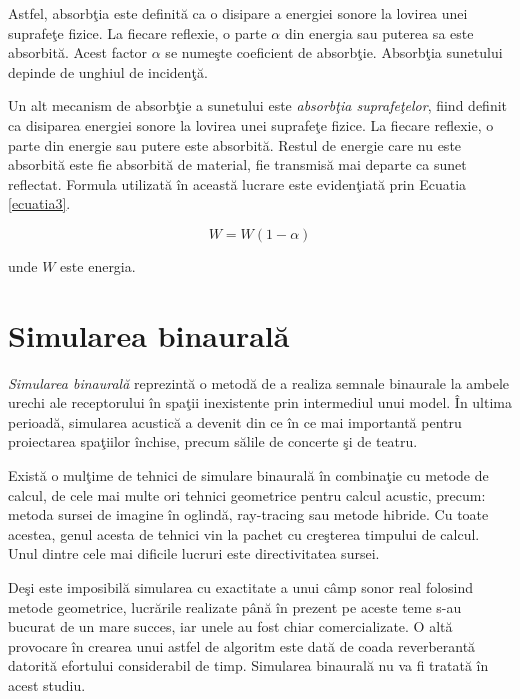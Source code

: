 	Astfel, absorb\c{t}ia este definit\u{a} ca o disipare a energiei sonore la lovirea unei suprafe\c{t}e fizice. La fiecare reflexie, o parte $\alpha$ din energia sau puterea sa este absorbit\u{a}. Acest factor $\alpha$ se nume\c{s}te coeficient de absorb\c{t}ie. Absorb\c{t}ia sunetului depinde de unghiul de inciden\c{t}\u{a}.
	\bigskip
	
	Un alt mecanism de absorb\c{t}ie a sunetului este \textit{absorb\c{t}ia suprafe\c{t}elor}, fiind definit ca disiparea energiei sonore la lovirea unei suprafe\c{t}e fizice. La fiecare reflexie, o parte din energie sau putere este absorbit\u{a}. Restul de energie care nu este absorbit\u{a} este fie absorbit\u{a} de material, fie transmis\u{a} mai departe ca sunet reflectat. Formula utilizat\u{a} \^{i}n aceast\u{a} lucrare este eviden\c{t}iat\u{a} prin Ecuatia \eqref{ecuatia3}.
	
	\begin{equation}
		W = W(1-\alpha)
		\label{ecuatia3}
	\end{equation}
	
	\noindent unde $W$ este energia.
	
	\section{Simularea binaural\u{a}}
	
	\textit{Simularea binaural\u{a}} reprezint\u{a} o metod\u{a} de a realiza semnale binaurale la ambele urechi ale receptorului \^{i}n spa\c{t}ii inexistente prin intermediul unui model. \^{I}n ultima perioad\u{a}, simularea acustic\u{a} a devenit din ce \^{i}n ce mai important\u{a} pentru proiectarea spa\c{t}iilor \^{i}nchise, precum s\u{a}lile de concerte \c{s}i de teatru.
	\bigskip
	
	Exist\u{a} o mul\c{t}ime de tehnici de simulare binaural\u{a} \^{i}n combina\c{t}ie cu metode de calcul, de cele mai multe ori tehnici geometrice pentru calcul acustic, precum: metoda sursei de imagine \^{i}n oglind\u{a}, ray-tracing sau metode hibride. Cu toate acestea, genul acesta de tehnici vin la pachet cu cre\c{s}terea timpului de calcul. Unul dintre cele mai dificile lucruri este directivitatea sursei.
	
	\bigskip
	De\c{s}i este imposibil\u{a} simularea cu exactitate a unui c\^{a}mp sonor real folosind metode geometrice, lucr\u{a}rile realizate p\^{a}n\u{a} \^{i}n prezent pe aceste teme s-au bucurat de un mare succes, iar unele au fost chiar comercializate. O alt\u{a} provocare \^{i}n crearea unui astfel de algoritm este dat\u{a} de coada reverberant\u{a} datorit\u{a} efortului considerabil de timp. Simularea binaural\u{a} nu va fi tratat\u{a} \^{i}n acest studiu.
	
